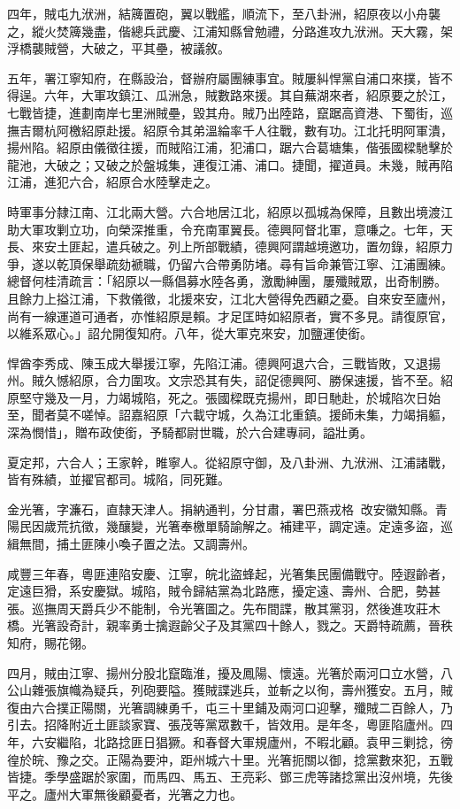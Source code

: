 \begin{pinyinscope}
四年，賊屯九洑洲，結簰置砲，翼以戰艦，順流下，至八卦洲，紹原夜以小舟襲之，縱火焚簰幾盡，偕總兵武慶、江浦知縣曾勉禮，分路進攻九洑洲。天大霧，架浮橋襲賊營，大破之，平其壘，被議敘。

五年，署江寧知府，在縣設治，督辦府屬團練事宜。賊屢糾悍黨自浦口來撲，皆不得逞。六年，大軍攻鎮江、瓜洲急，賊數路來援。其自蕪湖來者，紹原要之於江，七戰皆捷，進劃南岸七里洲賊壘，毀其舟。賊乃出陸路，竄踞高資港、下蜀街，巡撫吉爾杭阿檄紹原赴援。紹原令其弟溫綸率千人往戰，數有功。江北托明阿軍潰，揚州陷。紹原由儀徵往援，而賊陷江浦，犯浦口，踞六合葛塘集，偕張國樑馳擊於龍池，大破之；又破之於盤城集，連復江浦、浦口。捷聞，擢道員。未幾，賊再陷江浦，進犯六合，紹原合水陸擊走之。

時軍事分隸江南、江北兩大營。六合地居江北，紹原以孤城為保障，且數出境渡江助大軍攻剿立功，向榮深推重，令充南軍翼長。德興阿督北軍，意嗛之。七年，天長、來安土匪起，遣兵破之。列上所部戰績，德興阿謂越境邀功，置勿錄，紹原力爭，遂以乾頂保舉疏劾褫職，仍留六合帶勇防堵。尋有旨命兼管江寧、江浦團練。總督何桂清疏言：「紹原以一縣倡募水陸各勇，激勵紳團，屢殲賊眾，出奇制勝。且餘力上搤江浦，下救儀徵，北援來安，江北大營得免西顧之憂。自來安至廬州，尚有一線運道可通者，亦惟紹原是賴。才足匡時如紹原者，實不多見。請復原官，以維系眾心。」詔允開復知府。八年，從大軍克來安，加鹽運使銜。

悍酋李秀成、陳玉成大舉援江寧，先陷江浦。德興阿退六合，三戰皆敗，又退揚州。賊久憾紹原，合力圍攻。文宗恐其有失，詔促德興阿、勝保速援，皆不至。紹原堅守幾及一月，力竭城陷，死之。張國樑既克揚州，即日馳赴，於城陷次日始至，聞者莫不嗟悼。詔嘉紹原「六載守城，久為江北重鎮。援師未集，力竭捐軀，深為憫惜」，贈布政使銜，予騎都尉世職，於六合建專祠，謚壯勇。

夏定邦，六合人；王家幹，睢寧人。從紹原守御，及八卦洲、九洑洲、江浦諸戰，皆有殊績，並擢官都司。城陷，同死難。

金光箸，字濂石，直隸天津人。捐納通判，分甘肅，署巴燕戎格，改安徽知縣。青陽民因歲荒抗徵，幾釀變，光箸奉檄單騎諭解之。補建平，調定遠。定遠多盜，巡緝無間，捕土匪陳小喚子置之法。又調壽州。

咸豐三年春，粵匪連陷安慶、江寧，皖北盜蜂起，光箸集民團備戰守。陸遐齡者，定遠巨猾，系安慶獄。城陷，賊令歸結黨為北路應，擾定遠、壽州、合肥，勢甚張。巡撫周天爵兵少不能制，令光箸圖之。先布間諜，散其黨羽，然後進攻莊木橋。光箸設奇計，親率勇士擒遐齡父子及其黨四十餘人，戮之。天爵特疏薦，晉秩知府，賜花翎。

四月，賊由江寧、揚州分股北竄臨淮，擾及鳳陽、懷遠。光箸於兩河口立水營，八公山雜張旗幟為疑兵，列砲要隘。獲賊諜逃兵，並斬之以徇，壽州獲安。五月，賊復由六合撲正陽關，光箸調練勇千，屯三十里鋪及兩河口迎擊，殲賊二百餘人，乃引去。招降附近土匪談家寶、張茂等黨眾數千，皆效用。是年冬，粵匪陷廬州。四年，六安繼陷，北路捻匪日猖獗。和春督大軍規廬州，不暇北顧。袁甲三剿捻，徬徨於皖、豫之交。正陽為要沖，距州城六十里。光箸扼關以御，捻黨數來犯，五戰皆捷。季學盛踞於家圍，而馬四、馬五、王亮彩、鄧三虎等諸捻黨出沒州境，先後平之。廬州大軍無後顧憂者，光箸之力也。


\end{pinyinscope}
